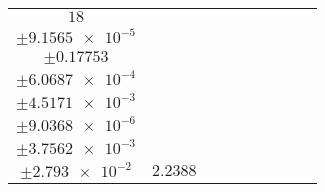 \documentclass[8pt]{article}
\begin{document}
\begin{longtable}[l]{c c c c c c c c c}
$\num{18}$ & \begin{tabular}[c]{@{}c@{}}$\num{3.0024e-2}$ \\ $\pm\num{9.1565e-5}$\end{tabular} & \begin{tabular}[c]{@{}c@{}}$\num{5.5964e-2}$ \\ $\pm\num{0.17753}$\end{tabular} & \begin{tabular}[c]{@{}c@{}}$\num{11.309}$ \\ $\pm\num{6.0687e-4}$\end{tabular} & \begin{tabular}[c]{@{}c@{}}$\num{1.6206e+3}$ \\ $\pm\num{4.5171e-3}$\end{tabular} & \begin{tabular}[c]{@{}c@{}}$\num{3.2422}$ \\ $\pm\num{9.0368e-6}$\end{tabular} & \begin{tabular}[c]{@{}c@{}}$\num{1.1616}$ \\ $\pm\num{3.7562e-3}$\end{tabular} & \begin{tabular}[c]{@{}c@{}}$\num{4.1071}$ \\ $\pm\num{2.793e-2}$\end{tabular} & $\num{2.2388}$\\
\bottomrule
\end{longtable}
\end{document}
